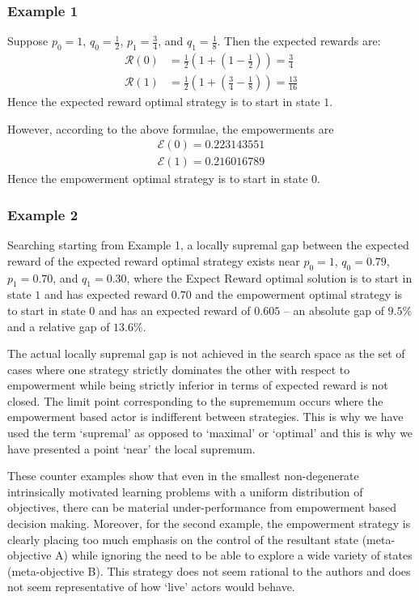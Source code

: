 \documentclass{article}
\newcommand{\Ee}{\mathcal{E}}
\newcommand{\Rr}{\mathcal{R}}
\begin{document}
\subsubsection{Example 1}
Suppose $p_0=1$, $q_0=\frac{1}{2}$, $p_1=\frac{3}{4}$, and $q_1 = \frac{1}{8}$. Then the expected rewards are:
\begin{align*}
\Rr(0) &= \frac{1}{2}\left(1+\left(1-\frac{1}{2}\right)\right)=\frac{3}{4}\\
\Rr(1) &= \frac{1}{2}\left(1+\left(\frac{3}{4}-\frac{1}{8}\right)\right)=\frac{13}{16}
\end{align*}
Hence the expected reward optimal strategy is to start in state $1$.

However, according to the above formulae, the empowerments are
\begin{align*}
\Ee(0)=0.223143551\\
\Ee(1)=0.216016789 
\end{align*}
Hence the empowerment optimal strategy is to start in state $0$.

\subsubsection{Example 2}
Searching starting from Example 1, a locally supremal gap between the expected reward of the expected reward optimal strategy exists near $p_0=1$, $q_0=0.79$, $p_1=0.70$, and $q_1 = 0.30$, where the Expect Reward optimal solution is to start in state $1$ and has expected reward $0.70$ and the empowerment optimal strategy is to start in state $0$ and has an expected reward of $0.605$ -- an absolute gap of $9.5\%$ and a relative gap of $13.6\%$. 

The actual locally supremal gap is not achieved in the search space as the set of cases where one strategy strictly dominates the other with respect to empowerment while being strictly inferior in terms of expected reward is not closed. The limit point corresponding to the suprememum occurs where the empowerment based actor is indifferent between strategies. This is why we have used the term `supremal' as opposed to `maximal' or `optimal' and this is why we have presented a point `near' the local supremum.

These counter examples show that even in the smallest non-degenerate intrinsically motivated learning problems with a uniform distribution of objectives, there can be material under-performance from empowerment based decision making. Moreover, for the second example, the empowerment strategy is clearly placing too much emphasis on the control of the resultant state (meta-objective A) while ignoring the need to be able to explore a wide variety of states (meta-objective B). This strategy does not seem rational to the authors and does not seem representative of how `live' actors would behave.
\end{document}
